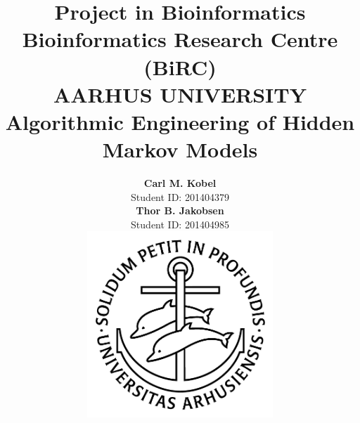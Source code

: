 \documentclass[11pt]{article}
\begin{document}
	
\title{Project in Bioinformatics \\
{\scriptsize Bioinformatics Research Centre (BiRC)\vspace{-7mm} \\
AARHUS UNIVERSITY} \\
\vspace{5mm}
\textbf{Algorithmic Engineering of Hidden Markov Models}}
\author{
    \textbf{Carl M. Kobel} \\ Student ID: 201404379
    \vspace{3mm} \\
    \textbf{Thor B. Jakobsen} \\ Student ID: 201404985
    \vspace{10mm} \\
    \includegraphics[width = 70mm]{figures/ausegl_sort.png}
}

\clearpage
\maketitle
\thispagestyle{empty}

\newpage
{}
\setcounter{page}{1}
\tableofcontents

\newpage
{}
\setcounter{page}{1}


















\newpage

{}


\newpage

\end{document}
